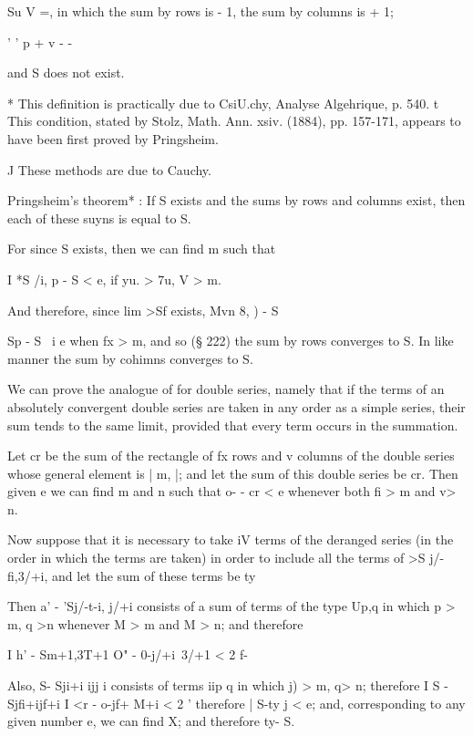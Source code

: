Su V =, in which the sum by rows is - 1, the sum by columns is + 1;

' ' p + v - -

and S does not exist.

* This definition is practically due to CsiU.chy, Analyse Algehrique,
p. 540. t This condition, stated by Stolz, Math. Ann. xsiv. (1884),
pp. 157-171, appears to have been first proved by Pringsheim.

J These methods are due to Cauchy.

%
%

Pringsheim's theorem* : If S exists and the sums by rows and columns
exist, then each of these suyns is equal to S.

For since S exists, then we can find m such that

I *S /i, p - S < e, if yu. > 7u, V > m.

And therefore, since lim >Sf exists, Mvn 8, ) - S %

  Sp - S \ i e when fx > m, and so (§ 222) the sum by rows converges
to S. In like manner the sum by cohimns converges to S.


We can prove the analogue of  for double series, namely that if
the terms of an absolutely convergent double series are taken in any
order as a simple series, their sum tends to the same limit, provided
that every term occurs in the summation.

Let cr be the sum of the rectangle of fx rows and v columns of the
double series whose general element is | m, |; and let the sum of
this double series be cr. Then given e we can find m and n such that
o- - cr < e whenever both fi > m and v> n.

Now suppose that it is necessary to take iV terms of the deranged
series (in the order in which the terms are taken) in order to include
all the terms of >S j/-fi,3/+i, and let the sum of these terms be ty

Then a' - 'Sj/-t-i, j/+i consists of a sum of terms of the type Up,q
in which p > m, q >n whenever M > m and M > n; and therefore

I h' - Sm+1,3T+1 O" - 0-j/+i\ 3/+1 < 2 f-

Also, S- Sji+i ijj i consists of terms iip q in which j) > m, q> n;
therefore I S - Sjfi+ijf+i I <r - o-jf+ M+i < 2 ' therefore | S-ty j <
e; and, corresponding to any given number e, we can find X; and
therefore ty- S.

